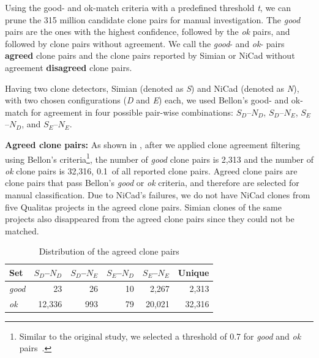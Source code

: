 \documentclass[sigconf,review, anonymous]{acmart}
\begin{document}
Using the good- and ok-match criteria with a predefined threshold
\textit{t}, we can prune the 315 million candidate clone pairs for
manual investigation. The \textit{good} pairs are the ones with the
highest confidence, followed by the \textit{ok} pairs, and followed by
clone pairs without agreement. We call the \textit{good}- and
\textit{ok}- pairs \textbf{agreed} clone pairs and the clone pairs
reported by Simian or NiCad without agreement \textbf{disagreed} clone
pairs.

Having two clone detectors, Simian (denoted as \textit{S}) and NiCad
(denoted as \textit{N}), with two chosen configurations (\textit{D}
and \textit{E}) each, we used Bellon's good- and ok-match for agreement
in four possible pair-wise combinations: $S_{D}$--$N_{D}$,
$S_{D}$--$N_{E}$, $S_{E}$--$N_{D}$, and $S_{E}$--$N_{E}$. %

\textbf{Agreed clone pairs: } As shown in , after we applied clone
agreement filtering using Bellon's criteria\footnote{Similar to the
  original study, we selected a threshold of 0.7 for
  \textit{good} and \textit{ok} pairs~\cite{Bellon2007}.}, the number
of \textit{good} clone pairs is 2,313 and the number of \textit{ok}
clone pairs is 32,316, 0.1\textperthousand~of all reported clone
pairs.  Agreed clone pairs are clone pairs that pass Bellon's
\textit{good} or \textit{ok} criteria, and therefore are selected for
manual classification.  Due to NiCad's failures, we do not have NiCad
clones from five Qualitas projects in the agreed clone pairs. Simian
clones of the same projects also disappeared from the agreed clone
pairs since they could not be matched.

\begin{table}
  \centering
  \caption{Distribution of the agreed clone pairs}
  \label{t_agreed_good_clone_pairs}
  \begin{tabular}{l|r|r|r|r|r}
    \hline
    Set & $S_D$--$N_D$ & $S_D$--$N_E$ & $S_E$--$N_D$ & $S_E$--$N_E$ & Unique \\
    \hline
    \textit{good} & 23 & 26 & 10 & 2,267 & 2,313 \\
    \textit{ok} & 12,336 & 993 & 79 & 20,021 & 32,316 \\
    \hline
  \end{tabular} %
\end{table}
\end{document}
